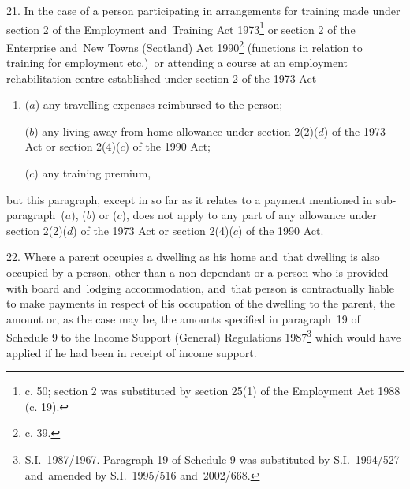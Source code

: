 \documentclass[12pt,a4paper]{article}
\begin{document}

\medskip

21.  In the case of a person participating in arrangements for training made under section 2 of the Employment and~Training Act 1973\footnote{ c. 50; section 2 was substituted by section 25(1) of the Employment Act 1988 (c. 19).} or section 2 of the Enterprise and~New Towns (Scotland) Act 1990\footnote{ c. 39.} (functions in relation to training for employment etc.)\ or attending a course at an employment rehabilitation centre established under section 2 of the 1973 Act—
\begin{enumerate}\item[]
($a$) any travelling expenses reimbursed to the person;

($b$) any living away from home allowance under section 2(2)($d$) of the 1973 Act or section 2(4)($c$) of the 1990 Act;

($c$) any training premium,
\end{enumerate}
but this paragraph, except in so far as it relates to a payment mentioned in sub-paragraph~($a$), ($b$) or ($c$), does not apply to any part of any allowance under section 2(2)($d$) of the 1973 Act or section 2(4)($c$) of the 1990 Act.

\medskip

22.  Where a parent occupies a dwelling as his home and~that dwelling is also occupied by a person, other than a non-dependant or a person who is provided with board and~lodging accommodation, and~that person is contractually liable to make payments in respect of his occupation of the dwelling to the parent, the amount or, as the case may be, the amounts specified in 
paragraph~19 of Schedule 9 to the Income Support (General) Regulations 1987\footnote{S.I.\ 1987/1967. Paragraph 19 of Schedule 9 was substituted by S.I.\ 1994/527 and~amended by S.I.\ 1995/516 and~2002/668.} which would have applied if he had been in receipt of income support.  %
\end{document}
